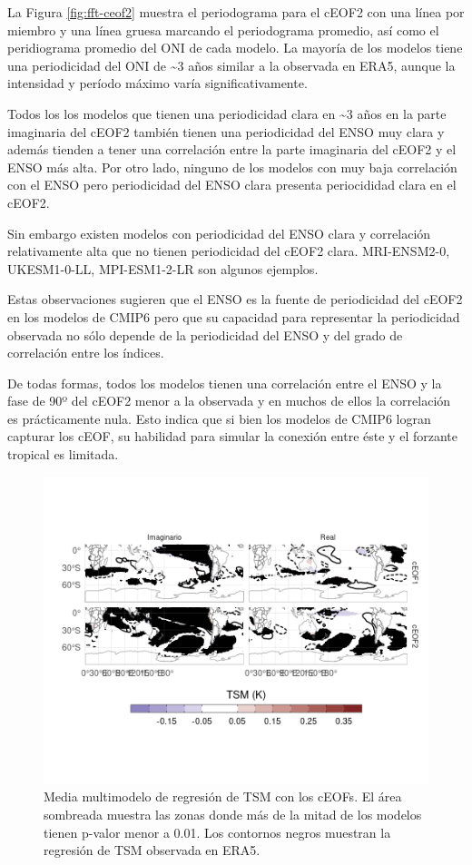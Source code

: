 \documentclass[12pt,oneside]{reedthesis}
\begin{document}
La Figura \ref{fig:fft-ceof2} muestra el periodograma para el cEOF2 con una línea por miembro y una línea gruesa marcando el periodograma promedio, así como el peridiograma promedio del ONI de cada modelo.
La mayoría de los modelos tiene una periodicidad del ONI de \textasciitilde3 años similar a la observada en ERA5, aunque la intensidad y período máximo varía significativamente.

Todos los los modelos que tienen una periodicidad clara en \textasciitilde3 años en la parte imaginaria del cEOF2 también tienen una periodicidad del ENSO muy clara y además tienden a tener una correlación entre la parte imaginaria del cEOF2 y el ENSO más alta.
Por otro lado, ninguno de los modelos con muy baja correlación con el ENSO pero periodicidad del ENSO clara presenta periocididad clara en el cEOF2.

Sin embargo existen modelos con periodicidad del ENSO clara y correlación relativamente alta que no tienen periodicidad del cEOF2 clara.
MRI-ENSM2-0, UKESM1-0-LL, MPI-ESM1-2-LR son algunos ejemplos.

Estas observaciones sugieren que el ENSO es la fuente de periodicidad del cEOF2 en los modelos de CMIP6 pero que su capacidad para representar la periodicidad observada no sólo depende de la periodicidad del ENSO y del grado de correlación entre los índices.

De todas formas, todos los modelos tienen una correlación entre el ENSO y la fase de 90º del cEOF2 menor a la observada y en muchos de ellos la correlación es prácticamente nula.
Esto indica que si bien los modelos de CMIP6 logran capturar los cEOF, su habilidad para simular la conexión entre éste y el forzante tropical es limitada.



\begin{figure}
\includegraphics{figures/50-cmip6/sst-mmm-1} \caption{Media multimodelo de regresión de TSM con los cEOFs. El área sombreada muestra las zonas donde más de la mitad de los modelos tienen p-valor menor a 0.01. Los contornos negros muestran la regresión de TSM observada en ERA5.}\label{fig:sst-mmm}
\end{figure}
\end{document}
